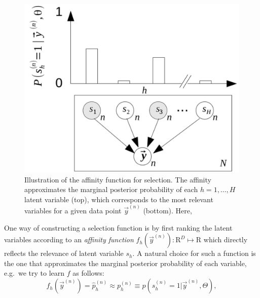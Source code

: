 \begin{figure}[h]
\begin{center}
\includegraphics[width=.535\textwidth]{graph-affinity2.pdf}
\caption{Illustration of the affinity function for selection.
The affinity approximates the marginal posterior probability of each $h=1,\dots,H$ latent variable (top), 
which corresponds to the most relevant variables for a given data point $\vec{y}^{(n)}$ (bottom). 
Here,  
}\label{fig:graph-affinity}
\end{center}
\end{figure}
%
One way of constructing a selection function %
is by first ranking the latent variables according to an 
\emph{affinity function} $f_h(\vec{y}^{(n)}) : \mathrm{R}^D \mapsto \mathrm{R}$ %
which directly reflects the relevance of latent variable $s_h$. 
%
A natural choice for such a function is the one that approximates the marginal posterior probability 
of each variable, e.g.\ we try to learn $f$ as follows:
%
\begin{equation}
\label{eq:affinity}
f_h(\vec{y}^{(n)}) = \hat{p}_h^{(n)} \approx p^{(n)}_h \equiv p(s^{(n)}_h = 1|\vec{y}^{(n)}, \Theta),
\end{equation}
%
